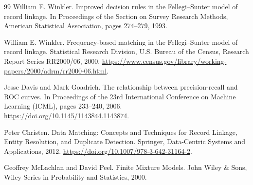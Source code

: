 \documentclass[conference]{IEEEtran}
\begin{document}
\begin{thebibliography}{99}
William E. Winkler.
\newblock Improved decision rules in the Fellegi--Sunter model of record linkage.
\newblock In Proceedings of the Section on Survey Research Methods, American Statistical Association, pages 274--279, 1993.

William E. Winkler.
\newblock Frequency-based matching in the Fellegi--Sunter model of record linkage.
\newblock Statistical Research Division, U.S. Bureau of the Census, Research Report Series RR2000/06, 2000.
\newblock \url{https://www.census.gov/library/working-papers/2000/adrm/rr2000-06.html}.

Jesse Davis and Mark Goadrich.
\newblock The relationship between precision-recall and ROC curves.
\newblock In Proceedings of the 23rd International Conference on Machine Learning (ICML), pages 233--240, 2006.
\newblock \url{https://doi.org/10.1145/1143844.1143874}.

Peter Christen.
\newblock Data Matching: Concepts and Techniques for Record Linkage, Entity Resolution, and Duplicate Detection.
\newblock Springer, Data-Centric Systems and Applications, 2012.
\newblock \url{https://doi.org/10.1007/978-3-642-31164-2}.

Geoffrey McLachlan and David Peel.
\newblock Finite Mixture Models.
\newblock John Wiley \& Sons, Wiley Series in Probability and Statistics, 2000.
\end{thebibliography}
\end{document}
